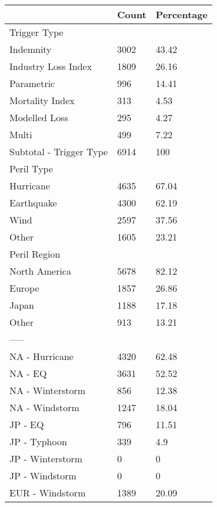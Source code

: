 \begin{tabular}{lll}
\toprule
{} & Count & Percentage \\
\midrule
Trigger Type              &       &            \\
  Indemnity               &  3002 &      43.42 \\
  Industry Loss Index     &  1809 &      26.16 \\
  Parametric              &   996 &      14.41 \\
  Mortality Index         &   313 &       4.53 \\
  Modelled Loss           &   295 &       4.27 \\
  Multi                   &   499 &       7.22 \\
  Subtotal - Trigger Type &  6914 &        100 \\
Peril Type                &       &            \\
  Hurricane               &  4635 &      67.04 \\
  Earthquake              &  4300 &      62.19 \\
  Wind                    &  2597 &      37.56 \\
  Other                   &  1605 &      23.21 \\
Peril Region              &       &            \\
  North America           &  5678 &      82.12 \\
  Europe                  &  1857 &      26.86 \\
  Japan                   &  1188 &      17.18 \\
  Other                   &   913 &      13.21 \\
  -----                   &       &            \\
  NA - Hurricane          &  4320 &      62.48 \\
  NA - EQ                 &  3631 &      52.52 \\
  NA - Winterstorm        &   856 &      12.38 \\
  NA - Windstorm          &  1247 &      18.04 \\
  JP - EQ                 &   796 &      11.51 \\
  JP - Typhoon            &   339 &        4.9 \\
  JP - Winterstorm        &     0 &          0 \\
  JP - Windstorm          &     0 &          0 \\
  EUR - Windstorm         &  1389 &      20.09 \\

\end{tabular}

